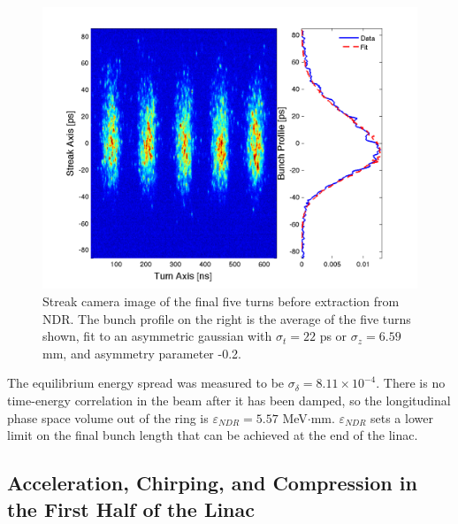 \documentclass[%
twocolumn,
showpacs,preprintnumbers,
 aps,
prstab,
]{revtex4-1}
\begin{document}
\begin{figure}[htb]
  \includegraphics[width=\columnwidth]{figures/combo.pdf}
  \caption{Streak camera image of the final five turns before extraction from NDR. The bunch profile on the right is the average of the five turns shown, fit to an asymmetric gaussian with $\sigma_t = 22$ ps or $\sigma_z = 6.59$ mm, and asymmetry parameter -0.2.}
  \label{streak}
\end{figure}

The equilibrium energy spread was measured to be $\sigma_{\delta} = 8.11 \times 10^{-4}$. There is no time-energy correlation in the beam after it has been damped, so the longitudinal phase space volume out of the ring is $\varepsilon_{NDR} = 5.57$ MeV$\cdot$mm. $\varepsilon_{NDR}$ sets a lower limit on the final bunch length that can be achieved at the end of the linac.

\subsection{Acceleration, Chirping, and Compression in the First Half of the Linac}
\end{document}
